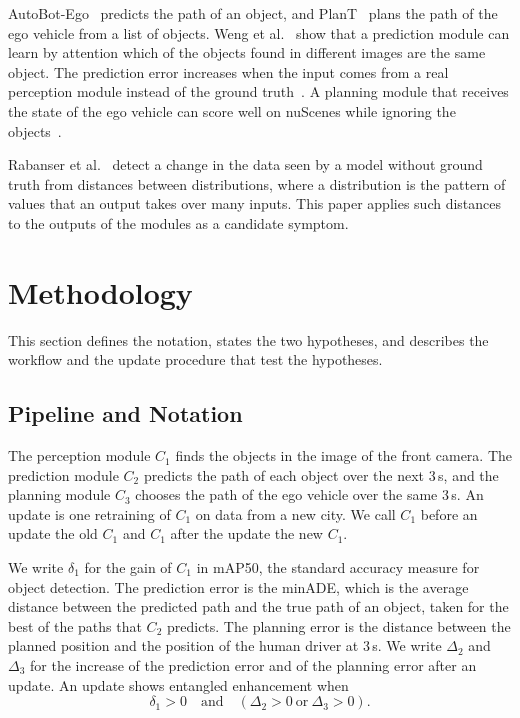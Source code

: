 \documentclass[conference]{IEEEtran}
\begin{document}
AutoBot-Ego~\cite{girgis2022autobots} predicts the path of an object, and PlanT~\cite{renz2022plant} plans the path of the ego vehicle from a list of objects. Weng et
al.~\cite{weng2022whose} show that a prediction module can learn by attention which of the objects found in different images are the same object. The prediction error increases
when the input comes from a real perception module instead of the ground
truth~\cite{xu2024realworld}. A planning module that receives
the state of the ego vehicle can score well on nuScenes while ignoring the
objects~\cite{zhai2023rethinking,li2024egostatus}.

Rabanser et al.~\cite{rabanser2019failing} detect a change in the data seen by
a model without ground truth from distances between distributions, where a
distribution is the pattern of values that an output takes over many inputs.
This paper applies such distances to the outputs of the modules as a candidate symptom.

\section{Methodology}

This section defines the notation, states the two hypotheses, and describes the workflow and the update procedure that test the hypotheses.

\subsection{Pipeline and Notation}
The perception module $C_1$ finds the objects in the image of the front camera.
The prediction module $C_2$ predicts the path of each object over the next
3\,s, and the planning module $C_3$ chooses the path of the ego vehicle over
the same 3\,s. An update is one retraining of $C_1$ on data from a new city. We
call $C_1$ before an update the old $C_1$ and $C_1$ after the update the new $C_1$.

We write $\delta_1$ for the gain of $C_1$ in mAP50, the standard accuracy
measure for object detection. The prediction error is the minADE, which is the
average distance between the predicted path and the true path of an object,
taken for the best of the paths that $C_2$ predicts. The planning error is the
distance between the planned position and the position of the human driver at
3\,s. We write $\Delta_2$ and $\Delta_3$ for the increase of the prediction
error and of the planning error after an update. An update shows entangled
enhancement when
\begin{equation}
\delta_1 > 0 \quad \text{and} \quad (\Delta_2 > 0 \ \text{or} \ \Delta_3 > 0).
\label{eq:ee}
\end{equation}
\end{document}
